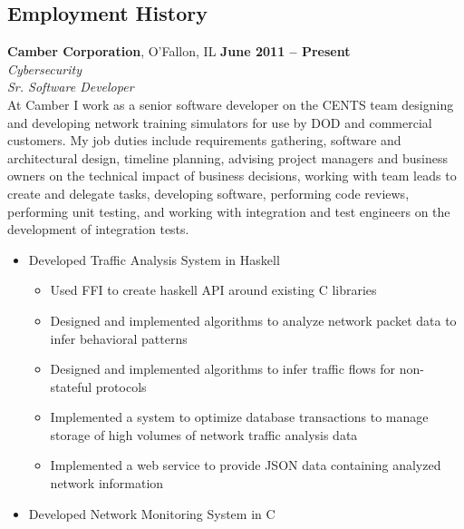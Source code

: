 \documentclass[margin,line]{resume}
\begin{document}
\begin{resume}
\section{\mysidestyle \textbf{Employment History}}
\textbf{Camber Corporation}, O'Fallon, IL \hfill \textbf{June 2011 -- Present}\vspace{1mm}\\\vspace{1mm}%
\textit{\small{Cybersecurity}}\vspace{1mm}\\\vspace{0mm}%
\textsl{Sr. Software Developer}\\
At Camber I work as a senior software developer on the CENTS team designing and
developing network training simulators for use by DOD and commercial customers.
My job duties include requirements gathering, software and architectural
design, timeline planning, advising project managers and business owners on the
technical impact of business decisions, working with team leads to create and
delegate tasks, developing software, performing code reviews, performing unit
testing, and working with integration and test engineers on the development of
integration tests.
\vspace{1mm}\\\vspace{0mm}
\begin{itemize}
    \item Developed Traffic Analysis System in Haskell
        \begin{itemize}
            \item Used FFI to create haskell API around existing C libraries
            \item Designed and implemented algorithms to analyze network packet
                data to infer behavioral patterns
            \item Designed and implemented algorithms to infer traffic flows
                for non-stateful protocols
            \item Implemented a system to optimize database transactions to
                manage storage of high volumes of network traffic analysis data
            \item Implemented a web service to provide JSON data containing
                analyzed network information
        \end{itemize}
    \item Developed Network Monitoring System in C
        \begin{itemize}

\end{itemize}
\end{itemize}
\end{resume}
\end{document}
